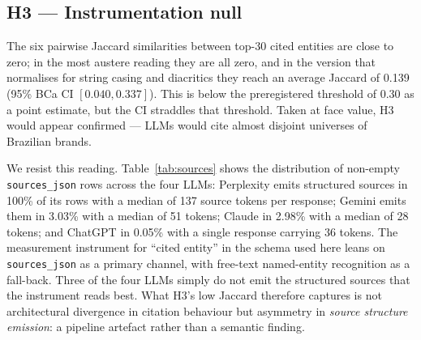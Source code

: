 \documentclass[preprint,12pt,authoryear]{elsarticle}
\begin{document}
\subsection{H3 --- Instrumentation null}
The six pairwise Jaccard similarities between top-30 cited entities are close to zero; in the most austere reading they are all zero, and in the version that normalises for string casing and diacritics they reach an average Jaccard of 0.139 (95\% BCa CI $[0.040, 0.337]$). This is below the preregistered threshold of 0.30 as a point estimate, but the CI straddles that threshold. Taken at face value, H3 would appear confirmed --- LLMs would cite almost disjoint universes of Brazilian brands.

We resist this reading. Table~\ref{tab:sources} shows the distribution of non-empty \texttt{sources\_json} rows across the four LLMs: Perplexity emits structured sources in 100\% of its rows with a median of 137 source tokens per response; Gemini emits them in 3.03\% with a median of 51 tokens; Claude in 2.98\% with a median of 28 tokens; and ChatGPT in 0.05\% with a single response carrying 36 tokens. The measurement instrument for ``cited entity'' in the schema used here leans on \texttt{sources\_json} as a primary channel, with free-text named-entity recognition as a fall-back. Three of the four LLMs simply do not emit the structured sources that the instrument reads best. What H3's low Jaccard therefore captures is not architectural divergence in citation behaviour but asymmetry in \emph{source structure emission}: a pipeline artefact rather than a semantic finding.

\begin{table}[htbp]
\centering
\small
\caption{Distribution of non-empty \texttt{sources\_json} across the four production LLMs (instrumentation evidence for H3).}
\label{tab:sources}
\end{table}
\end{document}
